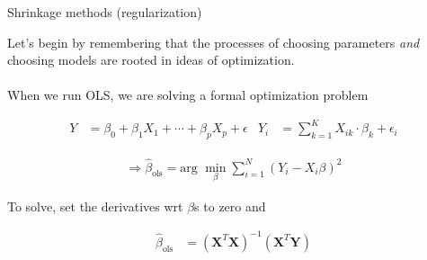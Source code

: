 \documentclass[mathserif, aspectratio=169]{beamer}
\begin{document}






\begin{frame}{Shrinkage methods (regularization)}

Let's begin by remembering that the processes of choosing parameters \textit{and} choosing models are rooted in ideas of optimization.\\~\\

When we run OLS, we are solving a formal optimization problem

\begin{align*}
Y &= \beta_0+\beta_1X_1+\cdots+\beta_p X_p+\epsilon & Y_i &= \sum_{k=1}^{K} X_{ik} \cdot \beta_k +\epsilon_i
\end{align*}

\begin{align*}
\Rightarrow \hat{\beta}_\text{ols} = \text{arg }\min_\beta \sum_{i=1}^N \left(Y_i - X_i \beta \right)^2
\end{align*}

To solve, set the derivatives wrt $\beta$s to zero and 

\begin{align*}
\hat{\beta}_\text{ols} &= \left(\mathbf{X}^T\mathbf{X}\right)^{-1} \left(\mathbf{X}^T\mathbf{Y}\right)
\end{align*}

\end{frame}
\end{document}
